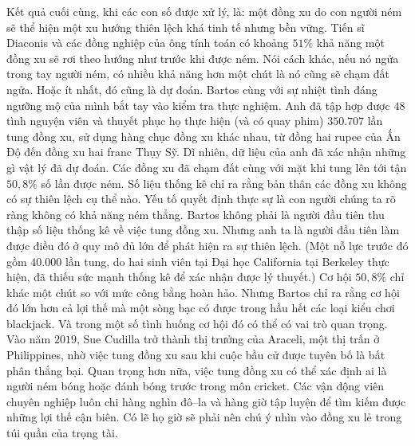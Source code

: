 \begin{multicols}{2}
	\vskip 0.1cm
	Kết quả cuối cùng, khi các con số được xử lý, là: một đồng xu do con người ném sẽ thể hiện một xu hướng thiên lệch khá tinh tế nhưng bền vững. Tiến sĩ Diaconis và các đồng nghiệp của ông tính toán có khoảng $51\%$ khả năng một đồng xu sẽ rơi theo hướng như trước khi được ném. Nói cách khác, nếu nó ngửa trong tay người ném, có nhiều khả năng hơn một chút là nó cũng sẽ chạm đất ngửa. Hoặc ít nhất, đó cũng là dự đoán.
	\vskip 0.1cm
	Bartos cùng với sự nhiệt tình đáng ngưỡng mộ của mình bắt tay vào kiểm tra thực nghiệm. Anh đã tập hợp được $48$ tình nguyện viên và thuyết phục họ thực hiện (và có quay phim) $350{.}707$ lần tung đồng xu, sử dụng hàng chục đồng xu khác nhau, từ đồng hai rupee của Ấn Độ đến đồng xu hai franc Thụy Sỹ. Dĩ nhiên, dữ liệu của anh  đã xác nhận những gì vật lý đã dự đoán. Các đồng xu đã chạm đất cùng với mặt khi tung lên tới tận $50,8\%$ số lần được ném.
	\vskip 0.1cm
	Số liệu thống kê chỉ ra rằng bản thân các đồng xu không có sự thiên lệch cụ thể nào. Yếu tố quyết định thực sự là con người chúng ta rõ ràng không có khả năng ném thẳng.  Bartos không phải là người đầu tiên thu thập số liệu thống kê về việc tung đồng xu. Nhưng anh ta là người đầu tiên làm được điều đó ở quy mô đủ lớn để phát hiện ra sự thiên lệch. (Một nỗ lực trước đó gồm $40{.}000$ lần tung, do hai sinh viên tại Đại học California tại Berkeley  thực hiện, đã thiếu sức mạnh thống kê để xác nhận được  lý thuyết.)
	\vskip 0.1cm
	Cơ hội $50,8\%$ chỉ khác một chút so với mức công bằng hoàn hảo. Nhưng  Bartos chỉ ra rằng cơ hội đó lớn hơn cả  lợi thế mà một sòng bạc có được trong hầu hết các loại kiểu chơi blackjack. Và trong một số tình huống cơ hội đó có thể có vai trò quan trọng. Vào năm $2019$, Sue Cudilla trở thành thị trưởng của Araceli, một thị trấn ở Philippines, nhờ việc tung đồng xu sau khi cuộc bầu cử được tuyên bố là bất phân thắng bại. Quan trọng hơn nữa, việc tung đồng xu có thể xác định ai là người ném bóng hoặc đánh bóng trước trong môn cricket. Các vận động viên chuyên nghiệp luôn chi hàng nghìn đô--la  và hàng giờ tập luyện để tìm kiếm được những lợi thế cận biên. Có lẽ họ giờ  sẽ phải nên chú ý nhìn vào đồng xu lẻ trong túi quần của trọng tài.
\end{multicols}
